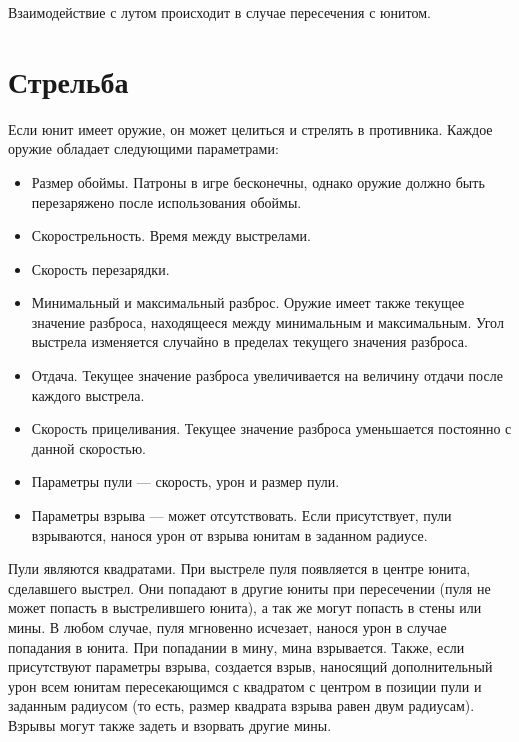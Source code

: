 Взаимодействие с лутом происходит в случае пересечения с юнитом.

\section{Стрельба}

Если юнит имеет оружие, он может целиться и стрелять в противника. Каждое оружие обладает следующими параметрами:
\begin{itemize}
      \item Размер обоймы. Патроны в игре бесконечны, однако оружие должно быть перезаряжено после использования обоймы.
      \item Скорострельность. Время между выстрелами.
      \item Скорость перезарядки.
      \item Минимальный и максимальный разброс. Оружие имеет также текущее значение разброса, находящееся между минимальным и максимальным.
            Угол выстрела изменяется случайно в пределах текущего значения разброса.
      \item Отдача. Текущее значение разброса увеличивается на величину отдачи после каждого выстрела.
      \item Скорость прицеливания. Текущее значение разброса уменьшается постоянно с данной скоростью.
      \item Параметры пули --- скорость, урон и размер пули.
      \item Параметры взрыва --- может отсутствовать.
            Если присутствует, пули взрываются, нанося урон от взрыва юнитам в заданном радиусе.
\end{itemize}

Пули являются квадратами. При выстреле пуля появляется в центре юнита, сделавшего выстрел.
Они попадают в другие юниты при пересечении (пуля не может попасть в выстрелившего юнита), а так же могут попасть в стены или мины.
В любом случае, пуля мгновенно исчезает, нанося урон в случае попадания в юнита.
При попадании в мину, мина взрывается.
Также, если присутствуют параметры взрыва, создается взрыв, наносящий дополнительный урон всем юнитам пересекающимся с квадратом
с центром в позиции пули и заданным радиусом (то есть, размер квадрата взрыва равен двум радиусам).
Взрывы могут также задеть и взорвать другие мины.

